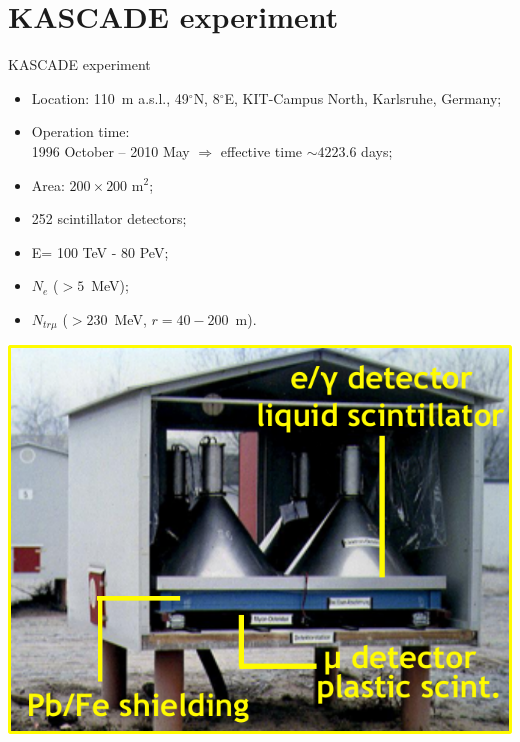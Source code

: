 \section{KASCADE experiment}

\begin{frame}{KASCADE experiment}
\begin{itemize}
\item Location: 110~m a.s.l., 49$^\circ$N, 8$^\circ$E, KIT-Campus North, Karlsruhe, Germany;
\end{itemize}
\vspace{-\itemsep}
\begin{minipage}[c]{0.5\textwidth}
\begin{itemize}
\item Operation time:\\1996 October -- 2010 May $\Rightarrow$ effective time $\sim 4223.6$ days;
\item Area: $200 \times 200$ m$^2$;
\item 252 scintillator detectors;
\item E= 100 TeV - 80 PeV;
\item $N_e$ ($> 5$~MeV);
\item $N_{tr \mu}$ ($> 230$~MeV, $r = 40 - 200$~m).
\end{itemize}
\end{minipage}\hfill
\begin{minipage}[c]{0.49\textwidth}
\includegraphics[width=1\textwidth]{pics/KASCADE-station.pdf}
\end{minipage}
\end{frame}

